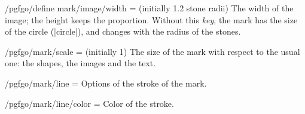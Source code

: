 \begin{key}{/pgfgo/define mark/image/width =  (initially 1.2 stone radii)}
	The width of the image; the height keeps the proportion. Without this \emph{key}, the mark has the size of the circle (|circle|), and changes with the radius of the stones.

	\begin{codeexample}[]

		\begin{goban}[5, partial = B2:D4]
		\end{goban}
	\end{codeexample}
\end{key}


\begin{key}{/pgfgo/mark/scale =  (initially 1)}
	The size of the mark with respect to the usual one: the shapes, the images and the text.

	\begin{codeexample}[]
		\begin{goban}[5, partial = B2:D4]
		\end{goban}
	\end{codeexample}
\end{key}


\begin{key}{/pgfgo/mark/line = }
	Options of the stroke of the mark.
\end{key}


\begin{key}{/pgfgo/mark/line/color = }
	Color of the stroke.

	\begin{codeexample}[]

		\begin{goban}
		\end{goban}

		\begin{goban}
			\stones[b]{C2,D3}
			\stone[w]{B4}
			\mark[triangle, line = {color = red}]{C3}
		\end{goban}
	\end{codeexample}
\end{key}


